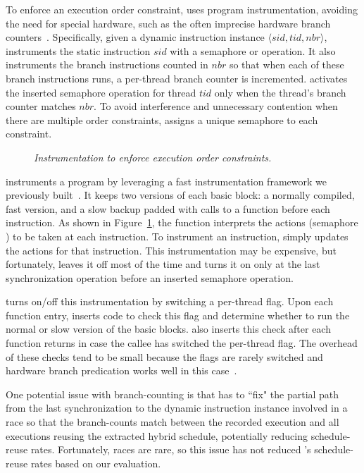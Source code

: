To enforce an execution order constraint, \peregrine uses program
instrumentation, avoiding the need for special hardware, such as the often
imprecise hardware branch counters~\cite{smp-revirt:vee08}.
Specifically, given a dynamic instruction instance $\langle sid, tid, nbr \rangle$, \peregrine
instruments the static instruction $sid$ with a semaphore  or
 operation. 
It also instruments the branch instructions counted in $nbr$ so that when
each of these branch instructions runs, a per-thread branch counter is
incremented.  \peregrine activates the inserted semaphore operation for thread
$tid$ only when the thread's branch counter matches $nbr$.  To avoid
interference and unnecessary contention when there are multiple order
constraints, \peregrine assigns a unique semaphore to each constraint.


\begin{figure}[t]
\centering
\begin{minipage}{0.45\textwidth}
\tiny {}
\end{minipage}
\vspace{-.1in}
\caption{\emph{Instrumentation to enforce execution order
    constraints.}} \label{fig:peregrine-slot}
\vspace{-.1in}
\end{figure}

\peregrine instruments a program by leveraging a fast instrumentation framework we
previously built~\cite{wu:loom:osdi10}.  It keeps two versions of each
basic block: a normally compiled, fast version, and a slow backup
padded with calls to a  function before each instruction.  As
shown in Figure~\ref{fig:peregrine-slot}, the  function interprets the
actions (semaphore ) to be taken at each instruction.  To
instrument an instruction, \peregrine simply updates the actions for that 
instruction.  This instrumentation may be expensive, but fortunately, \peregrine
leaves it off most of the time and turns it on only at the last
synchronization operation before an inserted semaphore operation.

\peregrine turns on/off this instrumentation by switching a per-thread flag.
Upon each function entry, \peregrine inserts code to check this flag and
determine whether to run the normal or slow version of the basic blocks.
\peregrine also inserts this check after each function returns in case the
callee has switched the per-thread flag.  The overhead of these checks
tend to be small because the flags are rarely switched 
and hardware branch predication works well in this case~\cite{wu:loom:osdi10}.

One potential issue with branch-counting is that \peregrine has to
``fix" the partial path from the last synchronization to the dynamic
instruction instance involved in a race so that the branch-counts match
between the recorded execution and all executions
reusing the extracted hybrid schedule, potentially reducing schedule-reuse rates.
Fortunately, races are rare, so this issue has not reduced \peregrine's
schedule-reuse rates based on our evaluation.

